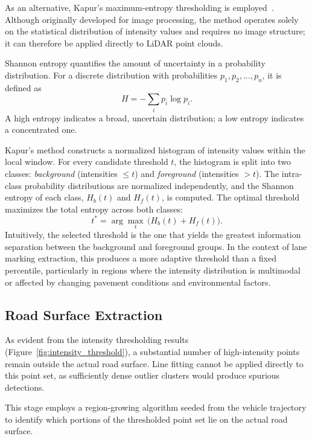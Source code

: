 As an alternative, Kapur's maximum-entropy thresholding is employed~\cite{KAPUR1985273}. Although originally developed for image processing, the method operates solely on the statistical distribution of intensity values and requires no image structure; it can therefore be applied directly to LiDAR point clouds.

Shannon entropy quantifies the amount of uncertainty in a probability distribution. For a discrete distribution with probabilities $p_1, p_2, \dots, p_n$, it is defined as
\begin{equation}
  H = -\sum_{i} p_i \log p_i.
  \label{eq:shannon_entropy}
\end{equation}
A high entropy indicates a broad, uncertain distribution; a low entropy indicates a concentrated one.

Kapur's method constructs a normalized histogram of intensity values within the local window. For every candidate threshold $t$, the histogram is split into two classes: \emph{background} (intensities $\leq t$) and \emph{foreground} (intensities $> t$). The intra-class probability distributions are normalized independently, and the Shannon entropy of each class, $H_b(t)$ and $H_f(t)$, is computed. The optimal threshold maximizes the total entropy across both classes:
\begin{equation}
  t^* = \arg\max_{t}\,\bigl(H_b(t) + H_f(t)\bigr).
  \label{eq:kapur}
\end{equation}
Intuitively, the selected threshold is the one that yields the greatest information separation between the background and foreground groups. In the context of lane marking extraction, this produces a more adaptive threshold than a fixed percentile, particularly in regions where the intensity distribution is multimodal or affected by changing pavement conditions and environmental factors.


\FloatBarrier
\subsection{Road Surface Extraction}
\label{sec:road_surface}

As evident from the intensity thresholding results (Figure~\ref{fig:intensity_threshold}), a substantial number of high-intensity points remain outside the actual road surface. Line fitting cannot be applied directly to this point set, as sufficiently dense outlier clusters would produce spurious detections.

This stage employs a region-growing algorithm seeded from the vehicle trajectory to identify which portions of the thresholded point set lie on the actual road surface.


